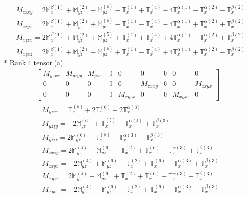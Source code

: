 \documentclass[fleqn,8pt,landscape]{jsarticle}
\begin{document}
\begin{align*}
& M_{zxxy} = 2 \mathbb{M}_{x}^{\beta(1)} + \mathbb{M}_{yz}^{(2)} - \mathbb{M}_{yz}^{(5)} - \mathbb{T}_{x}^{(1)} + \mathbb{T}_{x}^{(4)} - 4 \mathbb{T}_{x}^{\alpha(1)} - \mathbb{T}_{x}^{\alpha(2)} - \mathbb{T}_{x}^{\beta(2)} \\
& M_{zxyx} = 2 \mathbb{M}_{x}^{\beta(1)} + \mathbb{M}_{yz}^{(2)} + \mathbb{M}_{yz}^{(5)} - \mathbb{T}_{x}^{(1)} - \mathbb{T}_{x}^{(4)} - 4 \mathbb{T}_{x}^{\alpha(1)} + \mathbb{T}_{x}^{\alpha(2)} + \mathbb{T}_{x}^{\beta(2)} \\
& M_{xyzx} = 2 \mathbb{M}_{x}^{\beta(1)} + \mathbb{M}_{yz}^{(2)} + \mathbb{M}_{yz}^{(5)} + \mathbb{T}_{x}^{(1)} + \mathbb{T}_{x}^{(4)} + 4 \mathbb{T}_{x}^{\alpha(1)} - \mathbb{T}_{x}^{\alpha(2)} + \mathbb{T}_{x}^{\beta(2)} \\
& M_{xyxz} = 2 \mathbb{M}_{x}^{\beta(1)} + \mathbb{M}_{yz}^{(2)} - \mathbb{M}_{yz}^{(5)} + \mathbb{T}_{x}^{(1)} - \mathbb{T}_{x}^{(4)} + 4 \mathbb{T}_{x}^{\alpha(1)} + \mathbb{T}_{x}^{\alpha(2)} - \mathbb{T}_{x}^{\beta(2)}
\end{align*}
* Rank 4 tensor (a).
\begin{align*}
\begin{bmatrix} M_{yzxx} & M_{yzyy} & M_{yzzz} & 0 & 0 & 0 & 0 & 0 & 0 \\ 0 & 0 & 0 & 0 & 0 & M_{zxxy} & 0 & 0 & M_{zxyx} \\ 0 & 0 & 0 & 0 & M_{xyzx} & 0 & 0 & M_{xyxz} & 0 \end{bmatrix}
\end{align*}
\begin{align*}
& M_{yzxx} = \mathbb{T}_{x}^{(5)} + 2 \mathbb{T}_{x}^{(6)} + 2 \mathbb{T}_{x}^{\alpha(3)} \\
& M_{yzyy} = - 2 \mathbb{M}_{yz}^{(6)} + \mathbb{T}_{x}^{(5)} - \mathbb{T}_{x}^{\alpha(3)} + \mathbb{T}_{x}^{\beta(3)} \\
& M_{yzzz} = 2 \mathbb{M}_{yz}^{(6)} + \mathbb{T}_{x}^{(5)} - \mathbb{T}_{x}^{\alpha(3)} - \mathbb{T}_{x}^{\beta(3)} \\
& M_{zxxy} = 2 \mathbb{M}_{yz}^{(4)} + \mathbb{M}_{yz}^{(6)} - \mathbb{T}_{x}^{(2)} + \mathbb{T}_{x}^{(6)} - \mathbb{T}_{x}^{\alpha(3)} + \mathbb{T}_{x}^{\beta(3)} \\
& M_{zxyx} = - 2 \mathbb{M}_{yz}^{(4)} + \mathbb{M}_{yz}^{(6)} + \mathbb{T}_{x}^{(2)} + \mathbb{T}_{x}^{(6)} - \mathbb{T}_{x}^{\alpha(3)} + \mathbb{T}_{x}^{\beta(3)} \\
& M_{xyzx} = 2 \mathbb{M}_{yz}^{(4)} - \mathbb{M}_{yz}^{(6)} + \mathbb{T}_{x}^{(2)} + \mathbb{T}_{x}^{(6)} - \mathbb{T}_{x}^{\alpha(3)} - \mathbb{T}_{x}^{\beta(3)} \\
& M_{xyxz} = - 2 \mathbb{M}_{yz}^{(4)} - \mathbb{M}_{yz}^{(6)} - \mathbb{T}_{x}^{(2)} + \mathbb{T}_{x}^{(6)} - \mathbb{T}_{x}^{\alpha(3)} - \mathbb{T}_{x}^{\beta(3)}
\end{align*}
\end{document}
